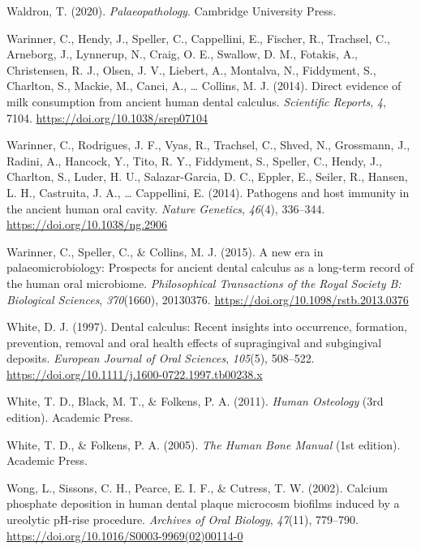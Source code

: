 \documentclass[
  letterpaper,
]{book}
\newlength{\cslhangindent}
\newlength{\cslentryspacingunit} %
\newenvironment{CSLReferences}[2] %
 {%
  \setlength{\parindent}{0pt}
  \ifodd #1
  \let\oldpar\par
  \def\par{\hangindent=\cslhangindent\oldpar}
  \fi
  \setlength{\parskip}{#2\cslentryspacingunit}
 }%
 {}
\begin{document}
\begin{CSLReferences}{1}{0}
\leavevmode{}%
Waldron, T. (2020). \emph{Palaeopathology}. {Cambridge University
Press}.

\leavevmode{}%
Warinner, C., Hendy, J., Speller, C., Cappellini, E., Fischer, R.,
Trachsel, C., Arneborg, J., Lynnerup, N., Craig, O. E., Swallow, D. M.,
Fotakis, A., Christensen, R. J., Olsen, J. V., Liebert, A., Montalva,
N., Fiddyment, S., Charlton, S., Mackie, M., Canci, A., \ldots{}
Collins, M. J. (2014). Direct evidence of milk consumption from ancient
human dental calculus. \emph{Scientific Reports}, \emph{4}, 7104.
\url{https://doi.org/10.1038/srep07104}

\leavevmode{}%
Warinner, C., Rodrigues, J. F., Vyas, R., Trachsel, C., Shved, N.,
Grossmann, J., Radini, A., Hancock, Y., Tito, R. Y., Fiddyment, S.,
Speller, C., Hendy, J., Charlton, S., Luder, H. U., Salazar-Garcia, D.
C., Eppler, E., Seiler, R., Hansen, L. H., Castruita, J. A., \ldots{}
Cappellini, E. (2014). Pathogens and host immunity in the ancient human
oral cavity. \emph{Nature Genetics}, \emph{46}(4), 336--344.
\url{https://doi.org/10.1038/ng.2906}

\leavevmode{}%
Warinner, C., Speller, C., \& Collins, M. J. (2015). A new era in
palaeomicrobiology: Prospects for ancient dental calculus as a long-term
record of the human oral microbiome. \emph{Philosophical Transactions of
the Royal Society B: Biological Sciences}, \emph{370}(1660), 20130376.
\url{https://doi.org/10.1098/rstb.2013.0376}

\leavevmode{}%
White, D. J. (1997). Dental calculus: Recent insights into occurrence,
formation, prevention, removal and oral health effects of supragingival
and subgingival deposits. \emph{European Journal of Oral Sciences},
\emph{105}(5), 508--522.
\url{https://doi.org/10.1111/j.1600-0722.1997.tb00238.x}

\leavevmode{}%
White, T. D., Black, M. T., \& Folkens, P. A. (2011). \emph{Human
{Osteology}} (3rd edition). {Academic Press}.

\leavevmode{}%
White, T. D., \& Folkens, P. A. (2005). \emph{The {Human Bone Manual}}
(1st edition). {Academic Press}.

\leavevmode{}%
Wong, L., Sissons, C. H., Pearce, E. I. F., \& Cutress, T. W. (2002).
Calcium phosphate deposition in human dental plaque microcosm biofilms
induced by a ureolytic {pH-rise} procedure. \emph{Archives of Oral
Biology}, \emph{47}(11), 779--790.
\url{https://doi.org/10.1016/S0003-9969(02)00114-0}


\end{CSLReferences}
\end{document}
